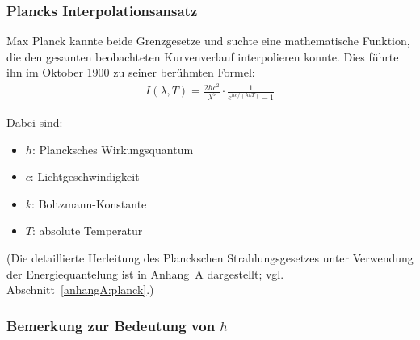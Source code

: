 \subsubsection{Plancks Interpolationsansatz}

Max Planck kannte beide Grenzgesetze und suchte eine mathematische Funktion, die den gesamten beobachteten Kurvenverlauf interpolieren konnte. Dies führte ihn im Oktober 1900 zu seiner berühmten Formel:
\begin{align}
	I(\lambda, T) = \frac{2hc^2}{\lambda^5} \cdot \frac{1}{e^{hc/(\lambda kT)} - 1}
\end{align}

Dabei sind:
\begin{itemize}
	\item \( h \): Plancksches Wirkungsquantum
	\item \( c \): Lichtgeschwindigkeit
	\item \( k \): Boltzmann-Konstante
	\item \( T \): absolute Temperatur
\end{itemize}
\raggedbottom
(Die detaillierte Herleitung des Planckschen Strahlungsgesetzes unter Verwendung der Energiequantelung ist in Anhang~A dargestellt; vgl. Abschnitt~\ref{anhangA:planck}.)
\subsubsection{Bemerkung zur Bedeutung von \( h \)}
\raggedbottom

